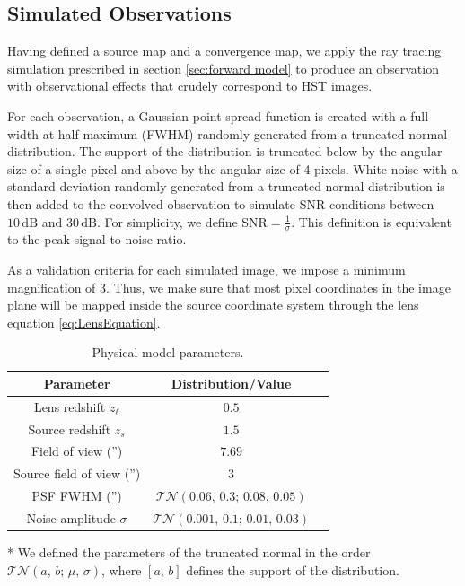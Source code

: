 \subsection{Simulated Observations}\label{sec:simulated observation}
Having defined a source map and a convergence map, we apply the ray tracing simulation 
prescribed in section \ref{sec:forward model} to produce an observation 
with observational effects that crudely correspond to HST images. 

For each observation, a Gaussian point spread function is 
created with a full width at half maximum (FWHM) 
randomly generated from a truncated normal distribution.
The support of the distribution is truncated below by the 
angular size of a single pixel and above by the angular size of 4 pixels. 
White noise with a standard deviation randomly generated from a truncated normal distribution 
is then added to the convolved observation to simulate SNR conditions between 
$10\,\mathrm{dB}$ and $30\,\mathrm{dB}$. For simplicity, we define $\mathrm{SNR} = \frac{1}{\sigma}$. 
This definition is equivalent to the peak signal-to-noise ratio. 

As a validation criteria for each simulated image, we impose 
a minimum magnification of 3. Thus, 
we make sure that most pixel coordinates in the image plane will be mapped inside the 
source coordinate system through the lens equation \eqref{eq:LensEquation}. 

\begin{table}[htb!]
\centering
\begin{threeparttable}
\caption{Physical model parameters.}
\label{tab:phys}
\begin{tabular}{ccc}
        Parameter &  Distribution/Value \\
        \hline \hline
        Lens redshift $z_\ell$ & $0.5$ \\
        Source redshift $z_s$ & $1.5$ \\
        Field of view ('') & $7.69$ \\
        Source field of view ('') & $3$ \\
        PSF FWHM ('') & $\mathcal{TN}(0.06,\, 0.3;\, 0.08,\, 0.05)$\tnote{*}\\
        Noise amplitude $\sigma$ & $\mathcal{TN}(0.001,\, 0.1;\, 0.01,\,0.03)$\tnote{*}\\
        \hline
\end{tabular}
\begin{tablenotes}\footnotesize
\item[*]We defined the parameters of the truncated normal in the order $\mathcal{TN}(a,\, b;\, \mu,\, \sigma)$, where $[a,\, b]$ defines the support of the distribution.
\end{tablenotes}
\end{threeparttable}
\end{table}

